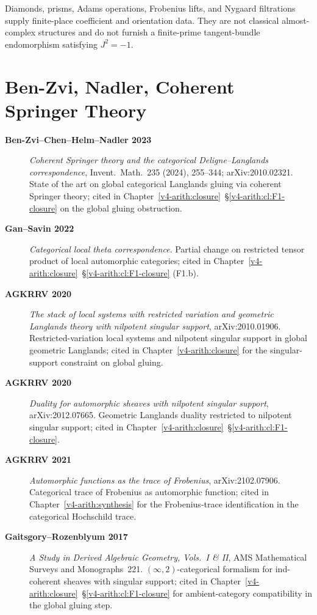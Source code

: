 Diamonds, prisms, Adams operations, Frobenius lifts, and Nygaard
filtrations supply finite-place coefficient and orientation data.
They are not classical almost-complex structures and do not furnish a
finite-prime tangent-bundle endomorphism satisfying \(J^{2}=-1\).

\section{Ben-Zvi, Nadler, Coherent Springer Theory}
\label{v4-arith:app:A:BZN-coherent-Springer}

\begin{description}
\item[\textbf{Ben-Zvi--Chen--Helm--Nadler 2023}] \emph{Coherent
Springer theory and the categorical Deligne--Langlands
correspondence}, Invent.~Math.~235 (2024), 255--344;
arXiv:2010.02321. State of the art on global categorical
Langlands gluing via coherent Springer theory; cited in
Chapter~\ref{v4-arith:closure}~\S\ref{v4-arith:cl:F1-closure}
on the global gluing obstruction.
\item[\textbf{Gan--Savin 2022}] \emph{Categorical local theta
correspondence}. Partial change on restricted
tensor product of local automorphic categories; cited in
Chapter~\ref{v4-arith:closure}~\S\ref{v4-arith:cl:F1-closure} (F1.b).
\item[\textbf{AGKRRV 2020}] \emph{The stack of local systems with
restricted variation and geometric Langlands theory with nilpotent
singular support}, arXiv:2010.01906. Restricted-variation local
systems and nilpotent singular support in global geometric Langlands;
cited in Chapter~\ref{v4-arith:closure} for the singular-support
constraint on global gluing.
\item[\textbf{AGKRRV 2020}] \emph{Duality for automorphic sheaves
with nilpotent singular support}, arXiv:2012.07665. Geometric
Langlands duality restricted to nilpotent singular support; cited
in Chapter~\ref{v4-arith:closure}~\S\ref{v4-arith:cl:F1-closure}.
\item[\textbf{AGKRRV 2021}] \emph{Automorphic functions as the trace
of Frobenius}, arXiv:2102.07906. Categorical trace of Frobenius
as automorphic function; cited in
Chapter~\ref{v4-arith:synthesis} for the Frobenius-trace
identification in the categorical Hochschild trace.
\item[\textbf{Gaitsgory--Rozenblyum 2017}] \emph{A Study in Derived
Algebraic Geometry, Vols.~I \& II}, AMS Mathematical Surveys and
Monographs~221.
\((\infty,2)\)-categorical formalism for ind-coherent sheaves
with singular support; cited in
Chapter~\ref{v4-arith:closure}~\S\ref{v4-arith:cl:F1-closure}
for ambient-category compatibility in the global gluing step.
\end{description}

